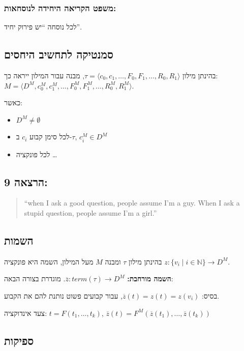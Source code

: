\documentclass[12pt,a4paper]{article}
\begin{document}
\subsubsection*{משפט הקריאה היחידה לנוסחאות:}

לכל נוסחה ``יש פירוק יחיד''.

\subsection*{סמנטיקה לתחשיב היחסים}

בהינתן מילון $\tau=\langle c_{0},c_{1},\ldots,F_{0},F_{1},\ldots,R_{0},R_{1}\rangle$, מבנה עבור המילון ייראה כך:
$M=\langle D^{M},c_{0}^{M},c_{1}^{M},\ldots,F_{0}^{M},F_{1}^{M},\ldots,R_{0}^{M},R_{1}^{M}\rangle$.

כאשר:

\begin{itemize}
  \item $D^{M}\neq\emptyset$
  \item לכל סימן קבוע $c_{i}$ ב-$\tau$, $c_{i}^{M}\in D^{M}$
  \item לכל פונקציה \ldots
\end{itemize}

\subsection*{הרצאה 9:}

\begin{quote}
\textenglish{``when I ask a good question, people assume I'm a guy. When I ask a stupid question, people assume I'm a girl.''}
\end{quote}

\subsection*{השמות}

בהינתן מילון $\tau$ ומבנה $M$ מעל המילון, השמה היא פונקציה $z:\{v_{i} \mid i\in\mathbb{N}\}\rightarrow D^{M}$.

\textbf{השמה מורחבת:} $\overline{z}:term(\tau)\rightarrow D^{M}$. מוגדרת בצורה הבאה:

בסיס: $\overline{z}(t)=z(t)=z(v_{i})$, עבור קבועים פשוט נותנת להם את הקבוע.

צעד אינדוקציה: $t=F(t_{1},\ldots,t_{k})$, $\overline{z}(t)=F^{M}(\overline{z}(t_{1}),\ldots,\overline{z}(t_{k}))$

\subsection*{ספיקות}
\end{document}
